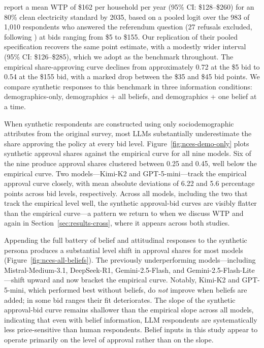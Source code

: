 \documentclass[12pt]{article}
\begin{document}
\textcite{Aldy2012} report a mean WTP of \$162 per household per year (95\% CI: \$128–\$260) for an 80\% clean electricity standard by 2035, based on a pooled logit over the 983 of 1,010 respondents who answered the referendum question (27 refusals excluded, following \textcite{Aldy2012}) at bids ranging from \$5 to \$155. Our replication of their pooled specification recovers the same point estimate, with a modestly wider interval (95\% CI: \$126–\$285), which we adopt as the benchmark throughout. The empirical share-approving curve declines from approximately 0.72 at the \$5 bid to 0.54 at the \$155 bid, with a marked drop between the \$35 and \$45 bid points. We compare synthetic responses to this benchmark in three information conditions: demographics-only, demographics + all beliefs, and demographics + one belief at a time.

When synthetic respondents are constructed using only sociodemographic
attributes from the original survey, most LLMs substantially underestimate
the share approving the policy at every bid level.
Figure~\ref{fig:nces-demo-only} plots synthetic approval shares against
the empirical curve for all nine models. Six of the nine produce approval
shares clustered between 0.25 and 0.45, well below the empirical curve.
Two models---Kimi-K2 and GPT-5-mini---track the empirical approval curve
closely, with mean absolute deviations of 6.22 and
5.6 percentage points across bid levels, respectively. Across
all models, including the two that track the empirical level well, the
synthetic approval-bid curves are visibly flatter than the empirical
curve---a pattern we return to when we discuss WTP and again in
Section~\ref{sec:results-cross}, where it appears across both studies.

Appending the full battery of belief and attitudinal responses to the
synthetic persona produces a substantial level shift in approval shares
for most models (Figure~\ref{fig:nces-all-beliefs}). The previously
underperforming models---including Mistral-Medium-3.1, DeepSeek-R1,
Gemini-2.5-Flash, and Gemini-2.5-Flash-Lite---shift upward and now
bracket the empirical curve. Notably, Kimi-K2 and GPT-5-mini, which
performed best without beliefs, do \emph{not} improve when beliefs are
added; in some bid ranges their fit deteriorates. The slope of the
synthetic approval-bid curve remains shallower than the empirical slope
across all models, indicating that even with belief information, LLM
respondents are systematically less price-sensitive than human respondents.
Belief inputs in this study appear to operate primarily on the level of
approval rather than on the slope.
\end{document}
